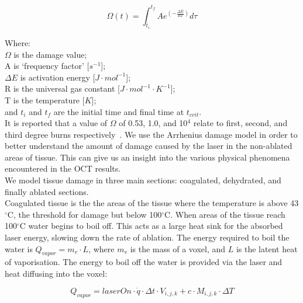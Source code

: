 \begin{equation}
\Omega(t)=\int^{t_{f}}_{t_i} Ae^{(-\tfrac{\Delta E}{RT})}d\tau
\end{equation}


\noindent Where:\\
	\indent $\Omega$ is the damage value; \\
	\indent A is `frequency factor' [$s^{-1}$];\\
	\indent $\Delta E$ is activation energy [$J\cdot mol^{-1}$];\\
	\indent R is the universal gas constant [$J\cdot mol^{-1}\cdot K^{-1}$];\\
	\indent T is the temperature [$K$];\\
	\indent and $t_i$ and $t_f$ are the initial time and final time at $t_{crit}$.\\

It is reported that a value of $\Omega$ of 0.53, 1.0, and 10$^4$ relate to first, second, and third degree burns respectively~\cite{diller1983finite}. We use the Arrhenius damage model in order to better understand the amount of damage caused by the laser in the non-ablated areas of tissue. This can give us an insight into the various physical phenomena encountered in the OCT results.\\

We model tissue damage in three main sections: coagulated, dehydrated, and finally ablated sections.\\

Coagulated tissue is the the areas of the tissue where the temperature is above 43$^{\circ}$C, the threshold for damage but below 100$^{\circ}$C.
When areas of the tissue reach 100$^{\circ}$C water begins to boil off. This acts as a large heat sink for the absorbed laser energy, slowing down the rate of ablation. The energy required to boil the water is $Q_{vapor}=m_v\cdot L$, where $m_v$ is the mass of a voxel, and $L$ is the latent heat of vaporisation. The energy to boil off the water is provided via the laser and heat diffusing into the voxel:

\begin{equation}
Q_{vapor}=laserOn\cdot\dot{q}\cdot \Delta t\cdot V_{i,j,k} + c\cdot M_{i,j,k}\cdot\Delta T
\end{equation}

